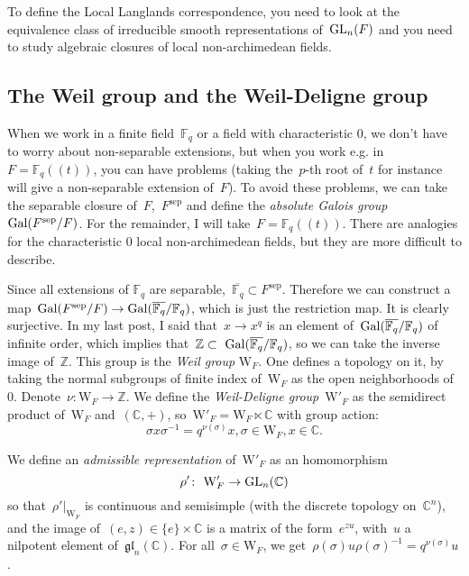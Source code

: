 To define the Local Langlands correspondence, you need to look at the equivalence class of irreducible smooth representations of~$\operatorname{GL}_n(F)$ and you need to study algebraic closures of local non-archimedean fields.

\subsection{The Weil group and the Weil-Deligne group}
When we work in a finite field~$\mathbb{F}_q$ or a field with characteristic 0, we don't have to worry about non-separable extensions, but when you work e.g. in~$F = \mathbb{F}_q (\!(t)\!)$, you can have problems (taking the~$p$-th root of~$t$ for instance will give a non-separable extension of~$F$). To avoid these problems, we can take the separable closure of~$F$,~$F^{\textrm{sep}}$ and define the \emph{absolute Galois group} $\operatorname{Gal}(F^{\textrm{sep}}/F)$. For the remainder, I will take~$F = \mathbb{F}_q (\!(t)\!)$. There are analogies for the characteristic 0 local non-archimedean fields, but they are more difficult to describe.

Since all extensions of $\mathbb{F}_q$ are separable,~$\overline{ \mathbb{F}_q} \subset F^{\textrm{sep}}$. Therefore we can construct a map~$\operatorname{Gal}(F^{\textrm{sep}}/F) \rightarrow \operatorname{Gal}(\overline{ \mathbb{F}_q} /\mathbb{F}_q)$, which is just the restriction map. It is clearly surjective. In my last post, I said that~$x \rightarrow x^q$ is an element of~$\operatorname{Gal}(\overline{ \mathbb{F}_q} /\mathbb{F}_q)$ of infinite order, which implies that~$\mathbb{Z} \subset \Gal(\overline{ \mathbb{F}_q} /\mathbb{F}_q)$, so we can take the inverse image of~$\mathbb{Z}$. This group is the \emph{Weil group} $\mathrm{W}_F$. One defines a topology on it, by taking the normal subgroups of finite index of~$\mathrm{W}_F$ as the open neighborhoods of~$0$. Denote~$\nu\colon\mathrm{W}_F \rightarrow \mathbb{Z}$. We define the \emph{Weil-Deligne group}~$\mathrm{W}'_F$ as the semidirect product of~$\mathrm{W}_F$ and~$(\mathbb{C},+)$, so~$\mathrm{W}'_F = \mathrm{W}_F \ltimes \mathbb{C}$ with group action:
\begin{equation}
  \sigma x \sigma^{-1} = q^{\nu(\sigma)}x, \sigma \in \mathrm{W}_F, x \in \mathbb{C}.
\end{equation}

We define an \emph{admissible representation} of~$\mathrm{W}'_F$ as an homomorphism
\begin{equation}
  \rho'\colon \mathrm{W}'_F \rightarrow \GL_n(\mathbb{C}) 
\end{equation}
so that~$\rho'|_{\mathrm{W}_F}$ is continuous and semisimple (with the discrete topology on~$\mathbb{C}^n$), and the image of~$(e,z) \in \{e\}\times\mathbb{C}$ is a matrix of the form~$e^{zu}$, with~$u$ a nilpotent element of~$\mathfrak{gl}_n(\mathbb{C})$. For all~$\sigma \in \mathrm{W}_F$, we get~$\rho(\sigma)u\rho(\sigma)^{-1} = q^{\nu(\sigma)}u$.

